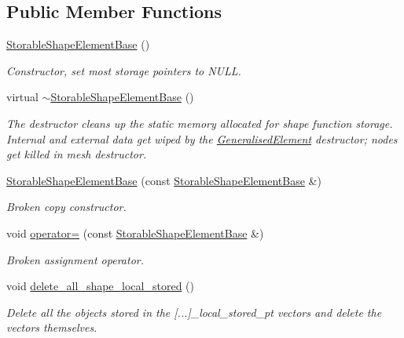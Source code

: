 \subsection*{Public Member Functions}
\begin{DoxyCompactItemize}
\item 
\hyperlink{classoomph_1_1StorableShapeElementBase_ad1edb32d057cccc152156d9fcaa48255}{Storable\+Shape\+Element\+Base} ()
\begin{DoxyCompactList}\small\item\em Constructor, set most storage pointers to N\+U\+LL. \end{DoxyCompactList}\item 
virtual \hyperlink{classoomph_1_1StorableShapeElementBase_a3de37b4bf61a78da326aade3c9169f76}{$\sim$\+Storable\+Shape\+Element\+Base} ()
\begin{DoxyCompactList}\small\item\em The destructor cleans up the static memory allocated for shape function storage. Internal and external data get wiped by the \hyperlink{classoomph_1_1GeneralisedElement}{Generalised\+Element} destructor; nodes get killed in mesh destructor. \end{DoxyCompactList}\item 
\hyperlink{classoomph_1_1StorableShapeElementBase_ae8d14ecd9aeb3956fda2001a5129b818}{Storable\+Shape\+Element\+Base} (const \hyperlink{classoomph_1_1StorableShapeElementBase}{Storable\+Shape\+Element\+Base} \&)
\begin{DoxyCompactList}\small\item\em Broken copy constructor. \end{DoxyCompactList}\item 
void \hyperlink{classoomph_1_1StorableShapeElementBase_a16fe819cb078829ef2165749e4a6da24}{operator=} (const \hyperlink{classoomph_1_1StorableShapeElementBase}{Storable\+Shape\+Element\+Base} \&)
\begin{DoxyCompactList}\small\item\em Broken assignment operator. \end{DoxyCompactList}\item 
void \hyperlink{classoomph_1_1StorableShapeElementBase_ae4707f6f7c3ecdf1db110d882ddab8bb}{delete\+\_\+all\+\_\+shape\+\_\+local\+\_\+stored} ()
\begin{DoxyCompactList}\small\item\em Delete all the objects stored in the \mbox{[}...\mbox{]}\+\_\+local\+\_\+stored\+\_\+pt vectors and delete the vectors themselves. \end{DoxyCompactList}\item 

\end{DoxyCompactItemize}
